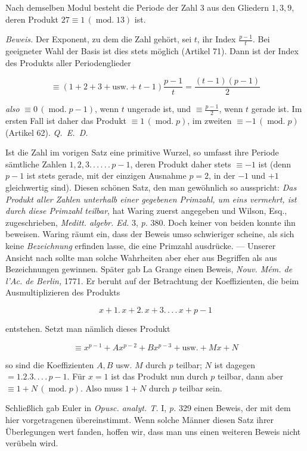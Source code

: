 Nach demselben Modul besteht die Periode der Zahl $3$ aus den Gliedern $1,3,9$, deren Produkt $27\equiv1\,(\operatorname{mod.}13)$ ist.

\emph{Beweis.} Der Exponent, zu dem die Zahl gehört, sei $t$, ihr Index $\frac{p-1}{t}$. Bei geeigneter Wahl der Basis ist dies stets möglich (Artikel 71). Dann ist der Index des Produkts aller Periodenglieder

\[\equiv(1+2+3+\text{usw.}+t-1)\frac{p-1}{t}=\frac{(t-1)(p-1)}{2}\]

\emph{also} $\equiv0\,(\operatorname{mod.}p-1)$, wenn $t$ ungerade ist, und $\equiv\frac{p-1}{2}$, wenn $t$ gerade ist. Im ersten Fall ist daher das Produkt $\equiv1\,(\operatorname{mod.}p)$, im zweiten $\equiv-1\,(\operatorname{mod.}p)$ (Artikel 62). \mbox{\emph{Q. E. D.}}

Ist die Zahl im vorigen Satz eine primitive Wurzel, so umfasst ihre Periode sämtliche Zahlen $1,2,3\mathpunct{.\,.\,.\,.\,.\,.}\,p-1$, deren Produkt daher stets $\equiv-1$ ist (denn $p-1$ ist stets gerade, mit der einzigen Ausnahme $p=2$, in der $-1$ und $+1$ gleichwertig sind). Diesen schönen Satz, den man gewöhnlich so ausspricht: \emph{Das Produkt aller Zahlen unterhalb einer gegebenen Primzahl, um eins vermehrt, ist durch diese Primzahl teilbar}, hat Waring zuerst angegeben und Wilson, Esq., zugeschrieben, \emph{Meditt. algebr. Ed.} 3, \emph{p.} 380. Doch keiner von beiden konnte ihn beweisen. Waring räumt ein, dass der Beweis umso schwieriger scheine, als sich keine \emph{Bezeichnung} erfinden lasse, die eine Primzahl ausdrücke. --- Unserer Ansicht nach sollte man solche Wahrheiten aber eher aus Begriffen als aus Bezeichnungen gewinnen. Später gab La Grange einen Beweis, \emph{Nouv. M\'em. de l'Ac. de Berlin,} 1771. Er beruht auf der
Betrachtung der Koeffizienten, die beim Ausmultiplizieren des Produkts

\[x+1.\,x+2.\,x+3\mathpunct{.\,.\,.\,.}\,x+p-1\]

\noindent entstehen. Setzt man nämlich dieses Produkt

\[\equiv x^{p-1}+Ax^{p-2}+Bx^{p-3}+\text{usw.}+Mx+N\]

\noindent so sind die Koeffizienten $A,B$ usw. $M$ durch $p$ teilbar; $N$ ist dagegen $=1.2.3\mathpunct{.\,.\,.\,.}\,p-1$. Für $x=1$ ist das Produkt nun durch $p$ teilbar, dann aber $\equiv1+N\,(\operatorname{mod.}p)$. Also muss $1+N$ durch $p$ teilbar sein.

Schließlich gab Euler in \emph{Opusc. analyt. T.} I, \emph{p.} 329 einen Beweis, der mit dem hier vorgetragenen übereinstimmt. Wenn solche Männer diesen Satz ihrer Überlegungen wert fanden, hoffen wir, dass man uns einen weiteren Beweis nicht verübeln wird.

